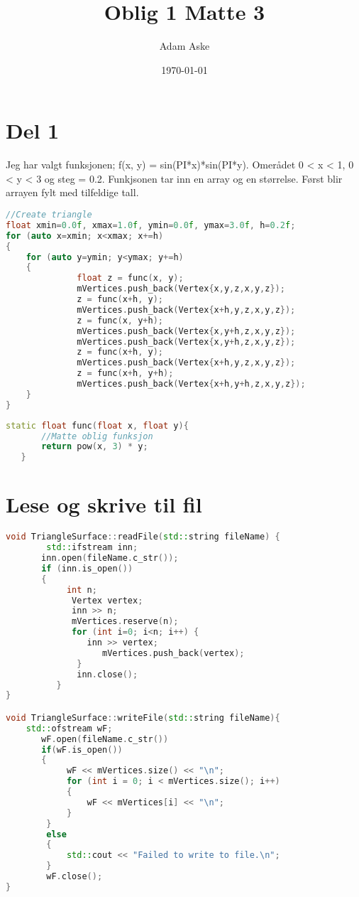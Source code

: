 \documentclass[a4paper,norsk]{article}
\title{Oblig 1 Matte 3}
\date{\today}
\author{Adam Aske}
\begin{document}
\maketitle
\tableofcontents
\newpage

\section{Del 1}
Jeg har valgt funksjonen; f(x, y) = sin(PI*x)*sin(PI*y). Omerådet 0 < x < 1, 0 < y < 3 og steg = 0.2.
Funkjsonen tar inn en array og en størrelse. Først blir arrayen fylt med tilfeldige tall. 
\begin{lstlisting}[language=C++, caption={trianglesurface.cpp}]
//Create triangle
float xmin=0.0f, xmax=1.0f, ymin=0.0f, ymax=3.0f, h=0.2f;
for (auto x=xmin; x<xmax; x+=h)
{
	for (auto y=ymin; y<ymax; y+=h)
	{
              float z = func(x, y);
              mVertices.push_back(Vertex{x,y,z,x,y,z});
              z = func(x+h, y);
              mVertices.push_back(Vertex{x+h,y,z,x,y,z});
              z = func(x, y+h);
              mVertices.push_back(Vertex{x,y+h,z,x,y,z});
              mVertices.push_back(Vertex{x,y+h,z,x,y,z});
              z = func(x+h, y);
              mVertices.push_back(Vertex{x+h,y,z,x,y,z});
              z = func(x+h, y+h);
              mVertices.push_back(Vertex{x+h,y+h,z,x,y,z});
	}
}
\end{lstlisting}
\begin{lstlisting}[language=C++, caption={trianglesurface.hh}]
static float func(float x, float y){
       //Matte oblig funksjon
       return pow(x, 3) * y;
   }
\end{lstlisting}
\section{Lese og skrive til fil}
\begin{lstlisting}[language=C++, caption={trianglesurface.cpp}]
void TriangleSurface::readFile(std::string fileName) {
    	std::ifstream inn;
       inn.open(fileName.c_str());
       if (inn.is_open())
       {
        	int n;
             Vertex vertex;
             inn >> n;
             mVertices.reserve(n);
             for (int i=0; i<n; i++) {
             	inn >> vertex;
                   mVertices.push_back(vertex);
              }
              inn.close();
          }
}

void TriangleSurface::writeFile(std::string fileName){
	std::ofstream wF;
       wF.open(fileName.c_str())
       if(wF.is_open())
       {
        	wF << mVertices.size() << "\n";
            for (int i = 0; i < mVertices.size(); i++)
            {
                wF << mVertices[i] << "\n";
            }
        }
        else
        {
            std::cout << "Failed to write to file.\n";
        }
        wF.close();
}
\end{lstlisting}
\end{document}
